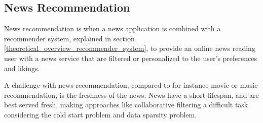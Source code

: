 \subsection{News Recommendation}
News recommendation is when a news application is combined with a recommender system, explained in section \ref{theoretical_overview_recommender_system}, to provide an online news reading user with a news service that are filtered or personalized to the user's preferences and likings.

A challenge with news recommendation, compared to for instance movie or music recommendation, is the freshness of the news. News have a short lifespan, and are best served fresh, making approaches like collaborative filtering a difficult task considering the cold start problem and data sparsity problem.




